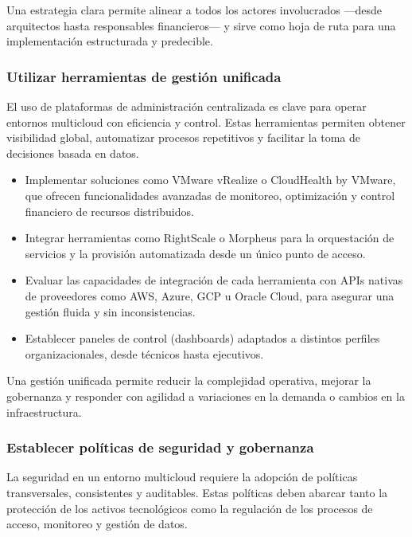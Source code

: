 {                Una estrategia clara permite alinear a todos los actores involucrados —desde arquitectos hasta responsables financieros— y sirve como hoja de ruta para una implementación estructurada y predecible.
                
            \subsubsection{Utilizar herramientas de gestión unificada}
                El uso de plataformas de administración centralizada es clave para operar entornos multicloud con eficiencia y control. Estas herramientas permiten obtener visibilidad global, automatizar procesos repetitivos y facilitar la toma de decisiones basada en datos.
                
                \begin{itemize}
                    \item Implementar soluciones como VMware vRealize o CloudHealth by VMware, que ofrecen funcionalidades avanzadas de monitoreo, optimización y control financiero de recursos distribuidos.
                    \item Integrar herramientas como RightScale o Morpheus para la orquestación de servicios y la provisión automatizada desde un único punto de acceso.
                    \item Evaluar las capacidades de integración de cada herramienta con APIs nativas de proveedores como AWS, Azure, GCP u Oracle Cloud, para asegurar una gestión fluida y sin inconsistencias.
                    \item Establecer paneles de control (dashboards) adaptados a distintos perfiles organizacionales, desde técnicos hasta ejecutivos.
                \end{itemize}
                
                Una gestión unificada permite reducir la complejidad operativa, mejorar la gobernanza y responder con agilidad a variaciones en la demanda o cambios en la infraestructura.
                
            \subsubsection{Establecer políticas de seguridad y gobernanza}
                La seguridad en un entorno multicloud requiere la adopción de políticas transversales, consistentes y auditables. Estas políticas deben abarcar tanto la protección de los activos tecnológicos como la regulación de los procesos de acceso, monitoreo y gestión de datos.
                
}
